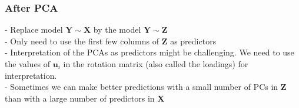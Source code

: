 \documentclass[11pt,a4paper]{article}
\begin{document}
\subsubsection{After PCA}
- Replace model $\mathbf{Y} \sim \mathbf{X}$ by the model $\mathbf{Y} \sim \mathbf{Z}$\\
- Only need to use the first few columns of $\mathbf{Z}$ as predictors\\
- Interpretation of the PCAs as predictors might be challenging. We need to use the values of $\mathbf{u}_{i}$ in the rotation matrix (also called the loadings) for interpretation.\\
- Sometimes we can make better predictions with a small number of PCs in $\mathbf{Z}$ than with a large number of predictors in $\mathbf{X}$\\
\end{document}
